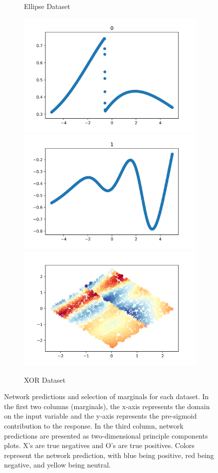 \begin{figure}[!h]
\begin{subfigure}{1.0\textwidth}
        \caption{Ellipse Dataset}
    \end{subfigure}
    \begin{subfigure}{1.0\textwidth}
        \centering
        \includegraphics[width=.33\textwidth]{fig/mnl/xr1.png}%
        \includegraphics[width=.33\textwidth]{fig/mnl/xr2.png}%
        \includegraphics[width=.33\textwidth]{fig/plt/xr.png}
        \caption{XOR Dataset}
    \end{subfigure}
    \caption{Network predictions and selection of marginals for each dataset. In the first two columns (marginals), the x-axis represents the domain on the input variable and the y-axis represents the pre-sigmoid contribution to the response. In the third column, network predictions are presented as two-dimensional principle components plots. X's are true negatives and O's are true positives. Colors represent the network prediction, with blue being positive, red being negative, and yellow being neutral.}
    \label{fig:big_fig_1}
\end{figure}




